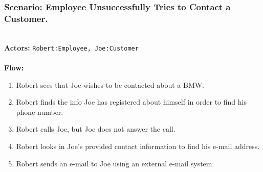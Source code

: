\subsubsection{Scenario: Employee Unsuccessfully Tries to Contact a Customer.}
\HRule \\[0.4cm]
\textbf{Actors:} \texttt{Robert:Employee, Joe:Customer}\\
\HRule \\[0.4cm]
\textbf{Flow:} \\
\begin{enumerate}
\item Robert sees that Joe wishes to be contacted about a BMW.
\item Robert finds the info Joe has registered about himself in order to find his phone number.
\item Robert calls Joe, but Joe does not answer the call.
\item Robert looks in Joe's provided contact information to find his e-mail address.
\item Robert sends an e-mail to Joe using an external e-mail system.
\end{enumerate}
\HRule \\[0.4cm]
